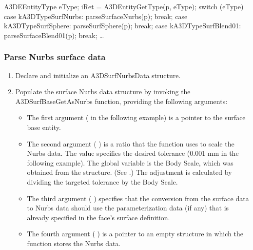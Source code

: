 \documentclass[letterpaper,12pt,english,openany,oneside]{sphinxmanual}
\begin{document}
\begin{sphinxVerbatim}[commandchars=\\\{\}]
A3DEEntityType eType;
iRet = A3DEntityGetType(p, \PYGZam{}eType);
switch (eType) \PYGZob{}
case kA3DTypeSurfNurbs:
  parseSurfaceNurbs(p);
  break;
case kA3DTypeSurfSphere:
  parseSurfSphere(p);
  break;
case kA3DTypeSurfBlend01:
  parseSurfaceBlend01(p);
  break;
…
\PYGZcb{}
\end{sphinxVerbatim}


\subsubsection{Parse Nurbs surface data}
\label{\detokenize{Plugins_A3D_API:parse-nurbs-surface-data}}\begin{enumerate}
%
\item {} 
Declare and initialize an A3DSurfNurbsData structure.

\item {} 
Populate the surface Nurbs data structure by invoking the A3DSurfBaseGetAsNurbs function, providing the following arguments:
\begin{itemize}
\item {} 
The first argument ( in the following example) is a pointer to the surface base entity.

\item {} 
The second argument ( ) is a ratio that the function uses to scale the Nurbs data. The value  specifies the desired tolerance (0.001 mm in the following example). The  global variable is the Body Scale, which was obtained from the  structure. (See .) The adjustment is calculated by dividing the targeted tolerance by the Body Scale.

\item {} 
The third argument ( ) specifies that the conversion from the surface data to Nurbs data should use the parameterization data (if any) that is already specified in the face’s surface definition.

\item {} 
The fourth argument ( ) is a pointer to an empty structure in which the function stores the Nurbs data.

\end{itemize}

\end{enumerate}
\end{document}
